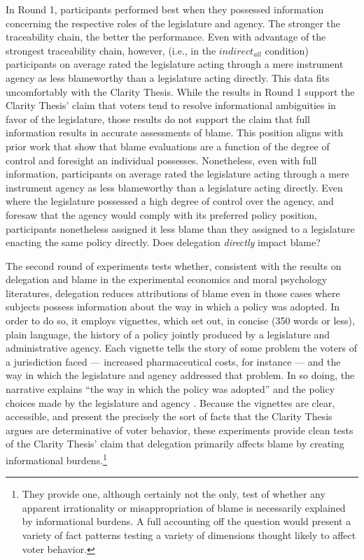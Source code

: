 \documentclass{article}
\begin{document}
In Round 1, participants performed best when they possessed information concerning the respective roles of the legislature and agency. The stronger the traceability chain, the better the performance. Even with advantage of the strongest traceability chain, however, (i.e., in the $indirect_{all}$ condition) participants on average rated the legislature acting through a mere instrument agency as less blameworthy than a legislature acting directly. This data fits uncomfortably with the Clarity Thesis. While the results in Round 1 support the Clarity Thesis' claim that voters tend to resolve informational ambiguities in favor of the legislature, those results do not support the claim that full information results in accurate assessments of blame. This position aligns with prior work that show that blame evaluations are a function of the degree of control and foresight an individual possesses. \citep{Cushman2012} Nonetheless, even with full information, participants on average rated the legislature acting through a mere instrument agency as less blameworthy than a legislature acting directly. Even where the legislature possessed a high degree of control over the agency, and foresaw that the agency would comply with its preferred policy position, participants nonetheless assigned it less blame than they assigned to a legislature enacting the same policy directly. Does delegation \emph{directly} impact blame? 

The second round of experiments tests whether, consistent with the results on delegation and blame in the experimental economics and moral psychology literatures, delegation reduces attributions of blame even in those cases where subjects possess information about the way in which a policy was adopted. In order to do so, it employs vignettes, which set out, in concise (350 words or less), plain language, the history of a policy jointly produced by a legislature and administrative agency. Each vignette tells the story of some problem the voters of a jurisdiction faced --- increased pharmaceutical costs, for instance --- and the way in which the legislature and agency addressed that problem. In so doing, the narrative explains ``the way in which the policy was adopted'' and the policy choices made by the legislature and agency \citep{Knutson2010}. Because the vignettes are clear, accessible, and present the precisely the sort of facts that the Clarity Thesis argues are determinative of voter behavior, these experiments provide clean tests of the Clarity Thesis' claim that delegation primarily affects blame by creating informational burdens.\footnote{They provide one, although certainly not the only, test of whether any apparent irrationality or misappropriation of blame is necessarily explained by informational burdens. A full accounting off the question would present a variety of fact patterns testing a variety of dimensions thought likely to affect voter behavior.}
\end{document}
